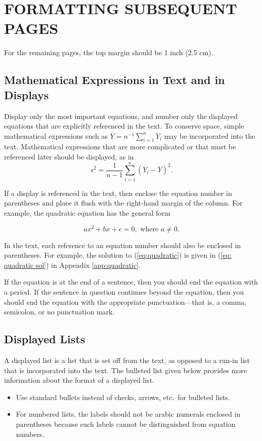 \documentclass{wscpaperproc}
\theoremstyle{wsc}
\begin{document}
\section{FORMATTING SUBSEQUENT PAGES}
For the remaining pages, the top margin should be 1 inch (2.5 cm).

\subsection{Mathematical Expressions in Text and in Displays}
Display only the most important equations, and number only the displayed equations that are explicitly referenced in the text.
To conserve space, simple mathematical expressions such as $\bar Y = n^{-1} \sum_{i=1}^n Y_i$ may be incorporated into the text.
Mathematical expressions that are more complicated or that must be referenced later should be displayed, as in
$$s^2 = \frac 1 {n-1} \sum_{i=1}^n (Y_i - \bar Y)^2.$$

If a display is referenced in the text, then enclose the equation number in parentheses and place it flush with the right-hand margin of the
column. For example, the quadratic equation has the general form

\begin{equation} \label{eq:quadratic}
ax^2 + bx + c = 0, \mbox{ where } a \ne 0.
\end{equation}

In the text, each reference to an equation number should also be enclosed in parentheses. For example, the solution to (\ref{eq:quadratic}) is given in (\ref{eq: quadratic sol}) in Appendix \ref{app:quadratic}.

If the equation is at the end of a sentence, then you should end the equation with a period. If the sentence in question continues beyond the equation, then you should end the equation with the appropriate punctuation---that is, a comma, semicolon, or no punctuation mark.

\subsection{Displayed Lists}
A displayed list is a list that is set off from the text, as opposed to a run-in list that is incorporated into the text. The bulleted list given below provides more information about the format of a displayed list.

\begin{itemize}
	\item Use standard bullets instead of checks, arrows, etc.\ for bulleted lists.
	\item For numbered lists, the labels should not be arabic numerals enclosed in parentheses because such labels cannot be distinguished from equation numbers.
\end{itemize}
\end{document}
